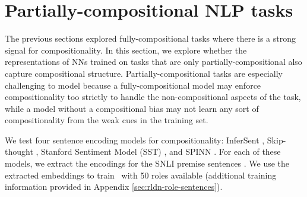 \section{Partially-compositional NLP tasks} \label{sec:rldn-NLP}
The previous sections explored fully-compositional tasks where there is a strong signal for compositionality. In this section, we explore whether the representations of NNs trained on tasks that are only partially-compositional also capture compositional structure. Partially-compositional tasks are especially challenging to model because a fully-compositional model may enforce compositionality too strictly to handle the non-compositional aspects of the task, while a model without a compositional bias may not learn any sort of compositionality from the weak cues in the training set.

We test four sentence encoding models for compositionality: InferSent \citep{conneau2017supervised}, Skip-thought \citep{kiros2015skip}, Stanford Sentiment Model (SST) \citep{socher2013recursive}, and SPINN \citep{bowman2016fast}. For each of these models, we extract the encodings for the SNLI premise sentences \citep{bowman2015large}. We use the extracted embeddings to train \RLN\ with 50 roles available (additional training information provided in Appendix \ref{sec:rldn-role-sentences}).

\begin{table}[h!]
    \centering
    \caption{\label{tab:sent-emb-mse}MSE loss for learned (bold) and hand-crafted role schemes on sentence embedding models. (Sec.~\ref{sec:rldn-NLP})}

\end{table}

